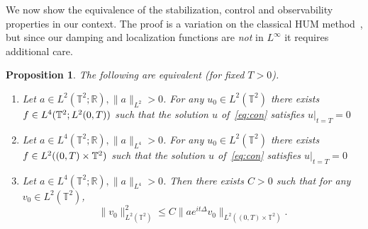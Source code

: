 \documentclass[11pt]{article}
\newtheorem{prop}[theo]{Proposition}
\theoremstyle{definition}
\numberwithin{equation}{section}
\numberwithin{figure}{section}
\numberwithin{table}{section}
\newcommand{\R}{{\mathbb R}}
\newcommand{\TT}{{\mathbb T}}
\begin{document}
We now show the equivalence of the stabilization, control and observability properties in our context. The proof is a variation on the classical HUM method~\cite{Li}, but since our damping and localization functions are \emph{not} in $L^\infty$ it requires additional care.
\begin{prop}\label{p:hum}
The following are equivalent (for fixed $T>0$).
\begin{enumerate}
\item \label{i}
Let $a \in L^2(\TT^2;\R), \| a \|_{L^2} >0$. For any $u_0\in L^2(\TT^2)$ there exists $f \in\linebreak L^4(\TT^2 ; L^2(0,T))$ such that the solution $u$ of~\eqref{eq:con} satisfies $u|_{t=T} =0$
\item \label{ii}
Let $a \in L^4(\TT^2;\R), \| a \|_{L^4} >0$. For any $u_0\in L^2(\TT^2)$ there exists $f \in\linebreak L^2((0,T)\times \TT^2)$ such that the solution $u$ of~\eqref{eq:con} satisfies $u |_{t=T} =0$
\item \label{iii}
Let $a \in L^4(\TT^2;\R), \| a \|_{L^4} >0$. Then there exists $C>0$ such that for any $v_0 \in L^2(\TT^2)$,
\begin{equation}\label{observation}
\| v_0 \|_{L^2(\TT^2)}^2 \leq C \| a e^{it \Delta} v_0 \| _{L^2((0,T) \times \TT^2)}.
\end{equation}
\end{enumerate}
\end{prop}
\end{document}

